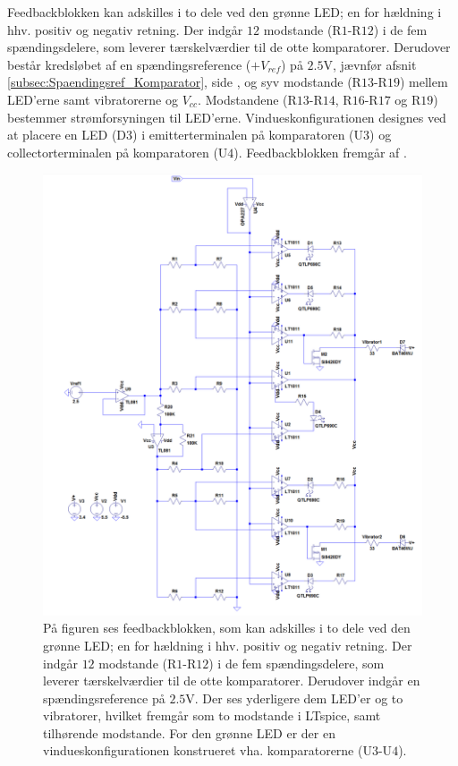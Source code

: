 Feedbackblokken kan adskilles i to dele ved den grønne LED; en for hældning i hhv. positiv og negativ retning. Der indgår $12$ modstande (R$1$-R$12$) i de fem spændingsdelere, som leverer tærskelværdier til de otte komparatorer. Derudover består kredsløbet af en spændingsreference ($+V_{ref}$) på $2.5$V, jævnfør afsnit \ref{subsec:Spaendingsref_Komparator}, side \pageref{subsec:Spaendingsref_Komparator}, og syv modstande (R$13$-R$19$) mellem LED'erne samt vibratorerne og $V_{cc}$. Modstandene (R$13$-R$14$, R$16$-R$17$ og R$19$) bestemmer strømforsyningen til LED'erne. Vindueskonfigurationen designes ved at placere en LED (D$3$) i emitterterminalen på komparatoren (U$3$) og collectorterminalen på komparatoren (U$4$). Feedbackblokken fremgår af . 

\begin{figure}[H] 
	\centering
	\includegraphics[scale=0.4]{figures/cProblemloesning/komparator_uden_vaerdi.PNG}
	\caption{På figuren ses feedbackblokken, som kan adskilles i to dele ved den grønne LED; en for hældning i hhv. positiv og negativ retning. Der indgår $12$ modstande (R$1$-R$12$) i de fem spændingsdelere, som leverer tærskelværdier til de otte komparatorer. Derudover indgår en spændingsreference på $2.5$V. Der ses yderligere dem LED'er og to vibratorer, hvilket fremgår som to modstande i LTspice, samt tilhørende modstande. For den grønne LED er der en vindueskonfigurationen konstrueret vha. komparatorerne (U$3$-U$4$).}
	\label{fig:komparator_uden_vaerdi}
\end{figure}

